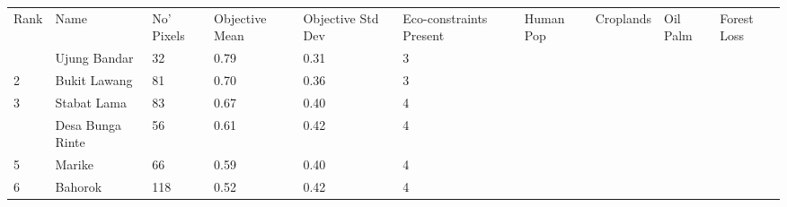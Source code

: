 \begin{table}[ht]
\centering
\begingroup\fontsize{9pt}{10pt}\selectfont
\begin{tabular}{C{0.05\textwidth}C{0.15\textwidth}C{0.08\textwidth}C{0.08\textwidth}C{0.08\textwidth}C{0.08\textwidth}C{0.08\textwidth}C{0.08\textwidth}C{0.08\textwidth}C{0.08\textwidth}}
 Rank & Name & No' Pixels & Objective Mean & Objective Std Dev & Eco-constraints  Present & Human Pop & Croplands & Oil Palm & Forest Loss \\ 
  & Ujung Bandar &  32 & \textcolor[HTML]{FFFFFF}{0.79} & \textcolor[HTML]{000000}{0.31} & \textcolor[HTML]{000000}{3} &  &  &  &  \\ 
  {2} & Bukit Lawang &  81 & \textcolor[HTML]{FFFFFF}{0.70} & \textcolor[HTML]{FFFFFF}{0.36} & \textcolor[HTML]{000000}{3} &  &  &  &  \\ 
  {3} & Stabat Lama &  83 & \textcolor[HTML]{FFFFFF}{0.67} & \textcolor[HTML]{FFFFFF}{0.40} & \textcolor[HTML]{FFFFFF}{4} &  &  &  &  \\ 
   & Desa Bunga Rinte &  56 & \textcolor[HTML]{FFFFFF}{0.61} & \textcolor[HTML]{FFFFFF}{0.42} & \textcolor[HTML]{FFFFFF}{4} &  &  &  &  \\ 
  {5} & Marike &  66 & \textcolor[HTML]{000000}{0.59} & \textcolor[HTML]{FFFFFF}{0.40} & \textcolor[HTML]{FFFFFF}{4} &  &  &  &  \\ 
  {6} & Bahorok & 118 & \textcolor[HTML]{000000}{0.52} & \textcolor[HTML]{FFFFFF}{0.42} & \textcolor[HTML]{FFFFFF}{4} &  &  &  &  \\ 

\end{tabular}
\end{table}
